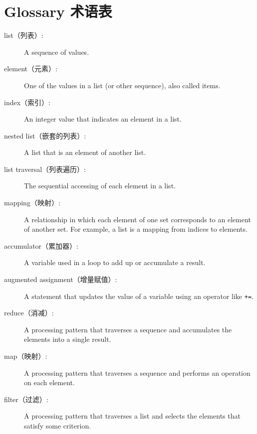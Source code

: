 \documentclass[10pt]{book}
\begin{document}
\begin{CJK}{UTF8}{gbsn}
\begin{enumerate}
\end{enumerate}



\section{Glossary 术语表}

\begin{description}

\item[list（列表）:] A sequence of values.

\item[element（元素）:] One of the values in a list (or other sequence),
also called items.

\item[index（索引）:] An integer value that indicates an element in a list.

\item[nested list（嵌套的列表）:] A list that is an element of another list.

\item[list traversal（列表遍历）:] The sequential accessing of each element in a list.

\item[mapping（映射）:] A relationship in which each element of one set
corresponds to an element of another set.  For example, a list is
a mapping from indices to elements.

\item[accumulator（累加器）:] A variable used in a loop to add up or
accumulate a result.

\item[augmented assignment（增量赋值）:] A statement that updates the value
of a variable using an operator like \verb"+=".

\item[reduce（消减）:] A processing pattern that traverses a sequence 
and accumulates the elements into a single result.

\item[map（映射）:] A processing pattern that traverses a sequence and
performs an operation on each element.

\item[filter（过滤）:] A processing pattern that traverses a list and
selects the elements that satisfy some criterion.


\end{description}
\end{CJK}
\end{document}
